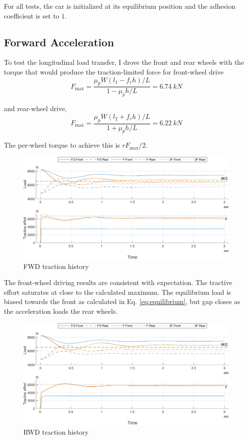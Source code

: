 \documentclass[9pt]{extarticle}
\begin{document}
\begin{multicols*}{2}
For all tests, the car is initialized at its equilibrium position and the
adhesion coefficient is set to \(1\).

\subsection{Forward Acceleration}

To test the longitudinal load transfer, I drove the front and rear wheels
with the torque that would produce the traction-limited force \cite{wongpulls}
for front-wheel drive
\begin{equation}
	F_\text{max} = \frac{\mu_p W (l_1 - f_r h)/L}{1 - \mu_p h/L} 
		= \SI{6.74}{kN}
\end{equation}

and rear-wheel drive,
\begin{equation}
	F_\text{max} = \frac{\mu_p W (l_2 + f_r h)/L}{1 + \mu_p h/L} 
		= \SI{6.22}{kN}
\end{equation}

The per-wheel torque to achieve this is \(rF_\text{max}/2\).

\begin{figure}[H]
	\centering
	\includegraphics[width=\linewidth]{fig/fwd_traction.pdf}
	\caption{FWD traction history}
\end{figure}

The front-wheel driving results are consistent with expectation. The tractive
effort saturates at close to the calculated maximum. The equilibrium load is
biased towards the front as calculated in Eq. \ref{eq:equilibrium}, but gap
closes as the acceleration loads the rear wheels.

\begin{figure}[H]
	\centering
	\includegraphics[width=\linewidth]{fig/rwd_traction.pdf}
	\caption{RWD traction history}
\end{figure}


\end{multicols*}
\end{document}
